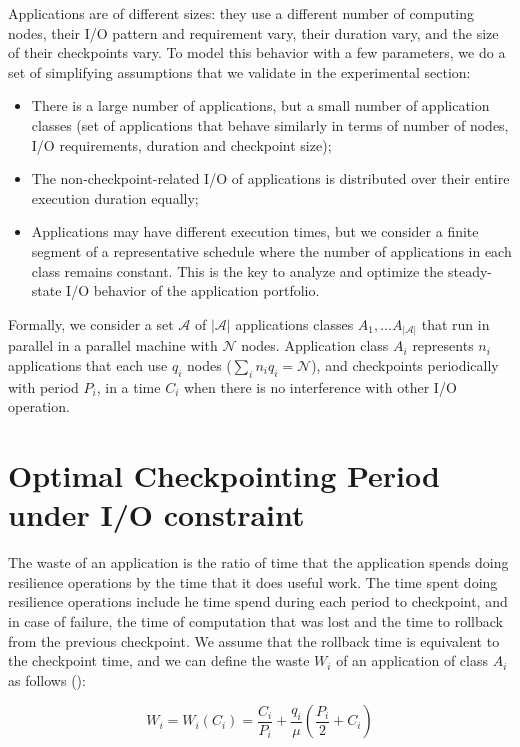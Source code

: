 \documentclass{article}
\newcommand{\appset}{{\mathcal A}}
\newcommand{\nbnodesplat}{{\mathcal N}}
\newcommand{\nbapps}{|{\mathcal A}|}
\newcommand{\app}[1]{A_{#1}}
\newcommand{\nbapp}[1]{n_{#1}}
\newcommand{\nbnodes}[1]{q_{#1}}
\newcommand{\period}[1]{P_{#1}}
\newcommand{\ckpt}[1]{C_{#1}}
\newcommand{\wasteapp}[1]{W_{#1}}
\newcommand{\mtbfplat}{\mu}
\newcommand{\wastefct}[2]{W_{#1}(#2)}
\begin{document}
Applications are of different sizes: they use a different number of
computing nodes, their I/O pattern and requirement vary, their
duration vary, and the size of their checkpoints vary. To model this
behavior with a few parameters, we do a set of simplifying assumptions
that we validate in the experimental section:
\begin{itemize}
  \item There is a large number of applications, but a small number of
    application classes (set of applications that behave similarly in
    terms of number of nodes, I/O requirements, duration and
    checkpoint size);
  \item The non-checkpoint-related I/O of applications is distributed
    over their entire execution duration equally;
  \item Applications may have different execution times, but we consider a finite
    segment of a representative schedule where the number of applications in each class remains constant. This is the key to analyze and optimize the steady-state I/O behavior of the 
    application portfolio. 
\end{itemize}

Formally, we consider a set $\appset$ of $\nbapps$ applications
classes $\app{1}, \ldots \app{\nbapps}$ that run in parallel in a
parallel machine with $\nbnodesplat$ nodes. Application class
$\app{i}$ represents $\nbapp{i}$ applications that each use
$\nbnodes{i}$ nodes
($\sum_{i}\nbapp{i} \nbnodes{i} = \nbnodesplat$), and checkpoints
periodically with period $\period{i}$, in a time $\ckpt{i}$ when there
is no interference with other I/O operation.

\section{Optimal Checkpointing Period under I/O constraint}
\label{sec.optimal}

The waste of an application is the ratio of time that the application spends doing
resilience operations by the time that it does useful work. The time
spent doing resilience operations include he time spend during each period to
checkpoint, and in case of failure, the time of computation that was
lost and the time to rollback from the previous checkpoint. We assume
that the rollback time is equivalent to the checkpoint time, and we
can define the waste $\wasteapp{i}$ of an application of class
$\app{i}$ as follows (\cite{springer-monograph}):

\begin{equation}
\wasteapp{i} = \wastefct{i}{\ckpt{i}} = \frac{\ckpt{i}}{\period{i}} +
\frac{\nbnodes{i}}{\mtbfplat}(\frac{\period{i}}{2} + \ckpt{i})
\label{eq.wasteAi}
\end{equation}
\end{document}
